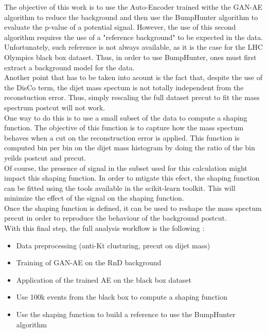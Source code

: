 \documentclass[letterpaper,11pt]{article}
\begin{document}
\noindent The objective of this work is to use the Auto-Encoder trained withe the GAN-AE algorithm to reduce the background and then use the BumpHunter algorithm to evaluate the p-value of a potential signal.
However, the use of this second algorithm requires the use of a "reference background" to be expected in the data.
Unfortunately, such reference is not always available, as it is the case for the LHC Olympics black box dataset.
Thus, in order to use BumpHunter, ones must first extract a background model for the data.\\
Another point that has to be taken into acount is the fact that, despite the use of the DisCo term, the dijet mass spectum is not totally independent from the reconstuction error.
Thus, simply rescaling the full dataset precut to fit the mass spectrum postcut will not work. \\

\noindent One way to do this is to use a small subset of the data to compute a shaping function.
The objective of this function is to capture how the mass spectum behaves when a cut on the reconstruction error is applied.
This function is computed bin per bin on the dijet mass histogram by doing the ratio of the bin yeilds postcut and precut.\\
Of course, the presence of signal in the subset used for this calculation might impact this shaping function.
In order to mtigate this efect, the shaping function can be fitted using the tools available in the scikit-learn toolkit.
This will minimize the effect of the signal on the shaping function.\\
Once the shaping function is defined, it can be used to reshape the mass spectum precut in order to reproduce the behaviour of the background postcut.\\

\noindent With this final step, the full analysis workflow is the following :
\begin{itemize}
	\item Data preprocessing (anti-Kt clusturing, precut on dijet mass)
	\item Training of GAN-AE on the RnD background
	\item Application of the trained AE on the black box dataset
	\item Use 100k events from the black box to compute a shaping function
	\item Use the shaping function to build a reference to use the BumpHunter algorithm
\end{itemize}
\end{document}
